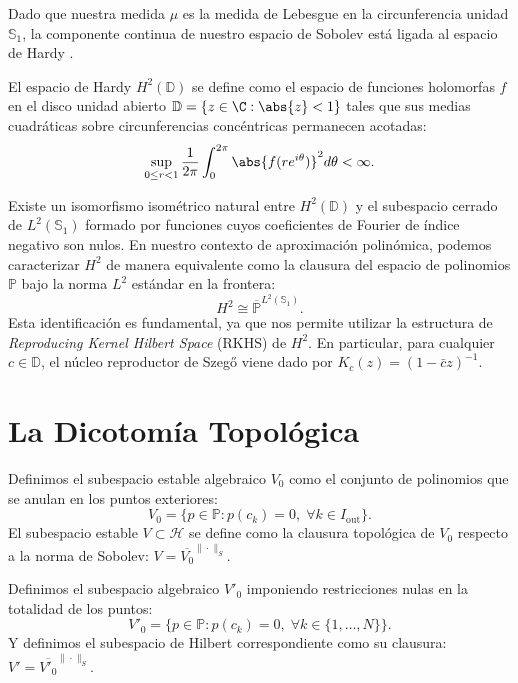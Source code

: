 Dado que nuestra medida $\mu$ es la medida de Lebesgue en la circunferencia unidad $\mathbb{S}_1$, la componente continua de nuestro espacio de Sobolev está ligada al espacio de Hardy \cite{duren1970theory}.

\begin{defn}
	El espacio de Hardy $H^2(\mathbb{D})$ se define como el espacio de funciones holomorfas $f$ en el disco unidad abierto $\mathbb{D} = \{z \in \C : \abs{z} < 1\}$ tales que sus medias cuadráticas sobre circunferencias concéntricas permanecen acotadas:
	$$ \sup_{0 \le r < 1} \frac{1}{2\pi} \int_{0}^{2\pi} \abs{f(re^{i\theta})}^2 d\theta < \infty. $$
\end{defn}

Existe un isomorfismo isométrico natural entre $H^2(\mathbb{D})$ y el subespacio cerrado de $L^2(\mathbb{S}_1)$ formado por funciones cuyos coeficientes de Fourier de índice negativo son nulos. En nuestro contexto de aproximación polinómica, podemos caracterizar $H^2$ de manera equivalente como la clausura del espacio de polinomios $\mathbb{P}$ bajo la norma $L^2$ estándar en la frontera:
$$ H^2 \cong \overline{\mathbb{P}}^{L^2(\mathbb{S}_1)}. $$
Esta identificación es fundamental, ya que nos permite utilizar la estructura de \textit{Reproducing Kernel Hilbert Space} (RKHS) de $H^2$. En particular, para cualquier $c \in \mathbb{D}$, el núcleo reproductor de Szegő viene dado por $K_c(z) = (1-\bar{c}z)^{-1}$.

\section{La Dicotomía Topológica}

\begin{defn}
	Definimos el subespacio estable algebraico $V_0$ como el conjunto de polinomios que se anulan en los puntos exteriores:
	\begin{equation}
		V_0 = \{p \in \mathbb{P} : p(c_k) = 0, \; \forall k \in I_{\mathrm{out}}\}.
	\end{equation}
	El subespacio estable $V \subset \mathcal{H}$ se define como la clausura topológica de $V_0$ respecto a la norma de Sobolev: $V = \overline{V_0}^{\|\cdot\|_S}$.
\end{defn}

\begin{defn}
	Definimos el subespacio algebraico $V'_0$ imponiendo restricciones nulas en la totalidad de los puntos:
	\begin{equation}
		V'_0 = \{p \in \mathbb{P} : p(c_k) = 0, \; \forall k \in \{1, \dots, N\}\}.
	\end{equation}
	Y definimos el subespacio de Hilbert correspondiente como su clausura: $V' = \overline{V'_0}^{\|\cdot\|_S}$.
\end{defn}

